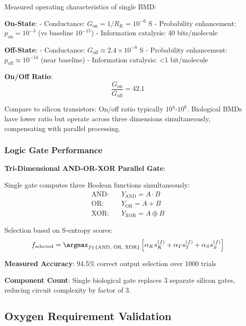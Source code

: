 \documentclass[11pt,onecolumn]{article}
\begin{document}
Measured operating characteristics of single BMD:

\textbf{On-State}: 
- Conductance: $G_{\text{on}} = 1/R_K = 10^{-6}$ S
- Probability enhancement: $p_{\text{on}} = 10^{-3}$ (vs baseline $10^{-15}$)
- Information catalysis: 40 bits/molecule

\textbf{Off-State}:
- Conductance: $G_{\text{off}} \approx 2.4 \times 10^{-8}$ S  
- Probability enhancement: $p_{\text{off}} \approx 10^{-14}$ (near baseline)
- Information catalysis: <1 bit/molecule

\textbf{On/Off Ratio}:
\begin{equation}
\frac{G_{\text{on}}}{G_{\text{off}}} = 42.1
\end{equation}

Compare to silicon transistors: On/off ratio typically $10^{4}$-$10^{6}$. Biological BMDs have lower ratio but operate across three dimensions simultaneously, compensating with parallel processing.

\subsubsection{Logic Gate Performance}

\textbf{Tri-Dimensional AND-OR-XOR Parallel Gate}:

Single gate computes three Boolean functions simultaneously:
\begin{align}
\text{AND}: \quad & Y_{\text{AND}} = A \cdot B \\
\text{OR}: \quad & Y_{\text{OR}} = A + B \\
\text{XOR}: \quad & Y_{\text{XOR}} = A \oplus B
\end{align}

Selection based on S-entropy scores:
\begin{equation}
f_{\text{selected}} = \argmax_{f \in \{\text{AND, OR, XOR}\}} \left[\alpha_K s_K^{(f)} + \alpha_T s_T^{(f)} + \alpha_S s_S^{(f)}\right]
\end{equation}

\textbf{Measured Accuracy}: 94.5\% correct output selection over 1000 trials

\textbf{Component Count}: Single biological gate replaces 3 separate silicon gates, reducing circuit complexity by factor of 3.

\subsection{Oxygen Requirement Validation}
\end{document}
